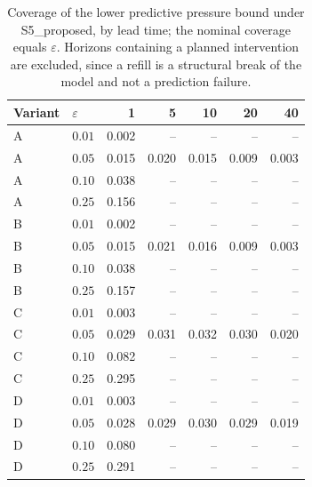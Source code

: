 \begin{table}[htbp]
\centering
\caption{Coverage of the lower predictive pressure bound under S5_proposed,
by lead time; the nominal coverage equals $\varepsilon$. Horizons
containing a planned intervention are excluded, since a refill is a
structural break of the model and not a prediction failure.}
\label{tab:ch6-calibration}
\begin{tabular}{@{}llrrrrr@{}}
\toprule
Variant & $\varepsilon$ & 1 & 5 & 10 & 20 & 40 \\
\midrule

A & $0.01$ & 0.002 & -- & -- & -- & -- \\
A & $0.05$ & 0.015 & 0.020 & 0.015 & 0.009 & 0.003 \\
A & $0.10$ & 0.038 & -- & -- & -- & -- \\
A & $0.25$ & 0.156 & -- & -- & -- & -- \\
\addlinespace
B & $0.01$ & 0.002 & -- & -- & -- & -- \\
B & $0.05$ & 0.015 & 0.021 & 0.016 & 0.009 & 0.003 \\
B & $0.10$ & 0.038 & -- & -- & -- & -- \\
B & $0.25$ & 0.157 & -- & -- & -- & -- \\
\addlinespace
C & $0.01$ & 0.003 & -- & -- & -- & -- \\
C & $0.05$ & 0.029 & 0.031 & 0.032 & 0.030 & 0.020 \\
C & $0.10$ & 0.082 & -- & -- & -- & -- \\
C & $0.25$ & 0.295 & -- & -- & -- & -- \\
\addlinespace
D & $0.01$ & 0.003 & -- & -- & -- & -- \\
D & $0.05$ & 0.028 & 0.029 & 0.030 & 0.029 & 0.019 \\
D & $0.10$ & 0.080 & -- & -- & -- & -- \\
D & $0.25$ & 0.291 & -- & -- & -- & -- \\
\bottomrule
\end{tabular}
\end{table}
